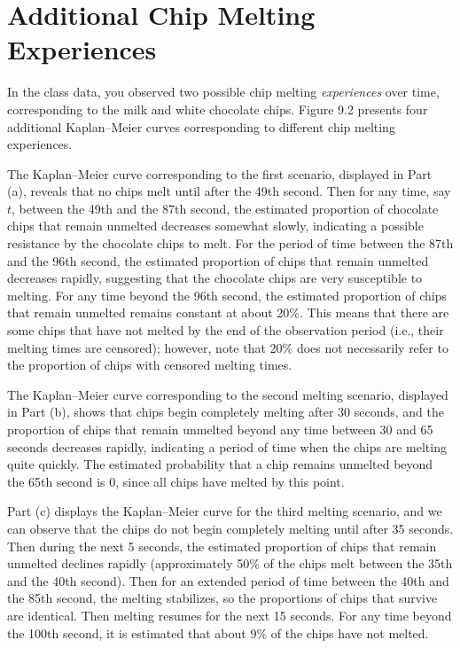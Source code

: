 \documentclass[
]{report}
\begin{document}
\section*{Additional Chip Melting Experiences}\label{additional-chip-melting-experiences}

In the class data, you observed two possible chip melting \emph{experiences} over time, corresponding to the milk and white chocolate chips. Figure 9.2 presents four additional Kaplan--Meier curves corresponding to different chip melting experiences.

The Kaplan--Meier curve corresponding to the first scenario, displayed in Part (a), reveals that no chips melt until after the 49th second. Then for any time, say \(t\), between the 49th and the 87th second, the estimated proportion of chocolate chips that remain unmelted decreases somewhat slowly, indicating a possible resistance by the chocolate chips to melt. For the period of time between the 87th and the 96th second, the estimated proportion of chips that remain unmelted decreases rapidly, suggesting that the chocolate chips are very susceptible to melting. For any time beyond the 96th second, the estimated proportion of chips that remain unmelted remains constant at about 20\%. This means that there are some chips that have not melted by the end of the observation period (i.e., their melting times are censored); however, note that 20\% does not necessarily refer to the proportion of chips with censored melting times.

The Kaplan--Meier curve corresponding to the second melting scenario, displayed in Part (b), shows that chips begin completely melting after 30 seconds, and the proportion of chips that remain unmelted beyond any time between 30 and 65 seconds decreases rapidly, indicating a period of time when the chips are melting quite quickly. The estimated probability that a chip remains unmelted beyond the 65th second is 0, since all chips have melted by this point.

Part (c) displays the Kaplan--Meier curve for the third melting scenario, and we can observe that the chips do not begin completely melting until after 35 seconds. Then during the next 5 seconds, the estimated proportion of chips that remain unmelted declines rapidly (approximately 50\% of the chips melt between the 35th and the 40th second). Then for an extended period of time between the 40th and the 85th second, the melting stabilizes, so the proportions of chips that survive are identical. Then melting resumes for the next 15 seconds. For any time beyond the 100th second, it is estimated that about 9\% of the chips have not melted.
\end{document}
